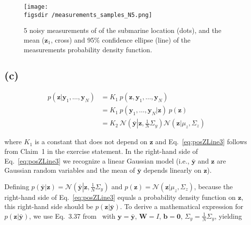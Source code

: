 \documentclass[12pt]{article}
\def\figsdir{../../../../../../code/scripts/probability/multivariateGaussians/inferenceInTheLinearGaussianModel/figures/}
\begin{document}
\begin{center}
    \begin{figure}[H]
        \texttt{[image: \\figsdir /measurements\_samples\_N5.png]}

        \caption{5 noisy measurements of of the submarine location (dots), and
        the mean ($\mathbf{z}_1$, cross) and 95\% confidence ellipse (line) of
        the measurements probability density function.}

        \label{fig:b}
    \end{figure}
\end{center}

\subsection*{(c)} 

\begin{align}
    p(\mathbf{z}|\mathbf{y}_1,\ldots,\mathbf{y}_N)&=K_1\ p(\mathbf{z},\mathbf{y}_1,\ldots,\mathbf{y}_N)\nonumber\\
                                                  &=K_1\ p(\mathbf{y}_1,\ldots,\mathbf{y}_N|\mathbf{z})\ p(\mathbf{z})\nonumber\\
                                                  &=K_2\
                                                  \mathcal{N}\left(\bar{\mathbf{y}}\left|\mathbf{z},\frac{1}{N}\Sigma_y\right.\right)\mathcal{N}\left(\mathbf{z}|\mu_z,\Sigma_z\right)\label{eq:posZLine3}
\end{align}

\noindent where $K_1$ is a constant that does not depend on $\mathbf{z}$ and
Eq.~\ref{eq:posZLine3} follows from Claim~1 in the exercise statement. In the
right-hand side of Eq.~\ref{eq:posZLine3} we recognize a linear Gaussian model
(i.e., $\bar{\mathbf{y}}$ and $\mathbf{z}$ are Gaussian random variables and
the mean of $\bar{\mathbf{y}}$ depends linearly on $\mathbf{z}$).

Defining
$p(\bar{\mathbf{y}}|\mathbf{z})=\mathcal{N}\left(\bar{\mathbf{y}}\left|\mathbf{z},\frac{1}{N}\Sigma_y\right.\right)$
and $p(\mathbf{z})=\mathcal{N}\left(\mathbf{z}|\mu_z,\Sigma_z\right)$, because
the right-hand side of Eq.~\ref{eq:posZLine3} equals a probability density
function on $\mathbf{z}$, this right-hand side should be
$p(\mathbf{z}|\bar{\mathbf{y}})$. To derive a mathematical expression for
$p(\mathbf{z}|\bar{\mathbf{y}})$, we use Eq.~3.37 from~\citet{murphyIntro22}
with $\mathbf{y}=\bar{\mathbf{y}}$, $\mathbf{W}=I$, $\mathbf{b}=\mathbf{0}$,
$\Sigma_y=\frac{1}{N}\Sigma_y$, yielding
\end{document}
